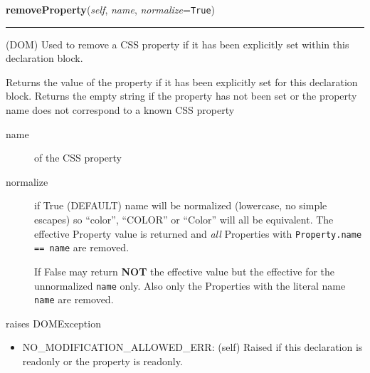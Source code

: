 \hspace{.8\funcindent}\begin{boxedminipage}{\funcwidth}

    \raggedright \textbf{removeProperty}(\textit{self}, \textit{name}, \textit{normalize}={\tt True})

    \vspace{-1.5ex}

    \rule{\textwidth}{0.5\fboxrule}
\setlength{\parskip}{2ex}

(DOM)
Used to remove a CSS property if it has been explicitly set within
this declaration block.

Returns the value of the property if it has been explicitly set for
this declaration block. Returns the empty string if the property
has not been set or the property name does not correspond to a
known CSS property
\begin{description}
\item[{name}] \leavevmode 
of the CSS property

\item[{normalize}] \leavevmode 
if True (DEFAULT) name will be normalized (lowercase, no simple
escapes) so ``color'', ``COLOR'' or ``Color'' will all be equivalent.
The effective Property value is returned and \emph{all} Properties
with \texttt{Property.name == name} are removed.

If False may return \textbf{NOT} the effective value but the effective
for the unnormalized \texttt{name} only. Also only the Properties with
the literal name \texttt{name} are removed.

\end{description}

raises DOMException
\begin{itemize}
\item {} 
NO{\_}MODIFICATION{\_}ALLOWED{\_}ERR: (self)
Raised if this declaration is readonly or the property is
readonly.

\end{itemize}
\setlength{\parskip}{1ex}
    \end{boxedminipage}

    \label{cssutils:css:cssstyledeclaration:CSSStyleDeclaration:setProperty}

